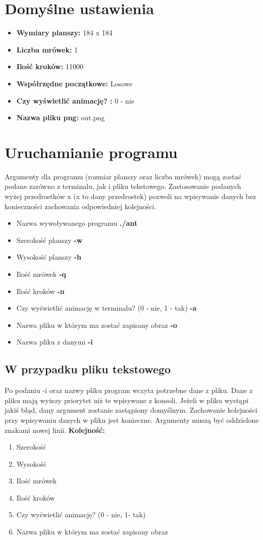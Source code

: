 \documentclass[a4paper,12pt]{article}
\begin{document}
\section{Domyślne ustawienia}
\begin{itemize}
\item \textbf{Wymiary planszy:} 184 x 184
\item \textbf{Liczba mrówek:} 1
\item \textbf{Ilość kroków:} 11000
\item \textbf{Współrzędne początkowe:} Losowe
\item \textbf{Czy wyświetlić animację? :} 0 - nie
\item \textbf{Nazwa pliku png:} out.png
\end{itemize}
\section{Uruchamianie programu}
Argumenty dla programu (rozmiar planszy oraz liczba mrówek) mogą zostać podane zarówno z terminalu, jak i pliku tekstowego. Zastosowanie podanych wyżej przedrostków x (x to dany przedrostek) pozwoli na wpisywanie danych bez konieczności zachowania odpowiedniej kolejności.
\begin{itemize}
\item Nazwa wywoływanego programu \textbf{./ant}
\item Szerokość planszy \textbf{-w}
\item Wysokość planszy \textbf{-h}
\item Ilość mrówek \textbf{-q}
\item Ilość kroków \textbf{-n}
\item Czy wyświetlić animację w terminalu? (0 - nie, 1 - tak) \textbf{-a}
\item Nazwa pliku w którym ma zostać zapisany obraz \textbf{-o}
\item Nazwa pliku z danymi \textbf{-i}
\end{itemize}
\newpage
\subsection{W przypadku pliku tekstowego}
Po podaniu -i oraz nazwy pliku program wczyta potrzebne dane z pliku. Dane z pliku mają wyższy priorytet niż te wpisywane z konsoli. Jeżeli w pliku wystąpi jakiś błąd, dany argument zostanie zastąpiony domyślnym. Zachowanie kolejności przy wpisywaniu danych w pliku jest konieczne.
Argumenty muszą być oddzielone znakami nowej linii.
\textbf{Kolejność:}
\begin{enumerate}
\item Szerokość
\item Wysokość
\item Ilość mrówek
\item Ilość kroków
\item Czy wyświetlić animację? (0 - nie, 1- tak)
\item Nazwa pliku w którym ma zostać zapisany obraz
\end{enumerate}
\end{document}
